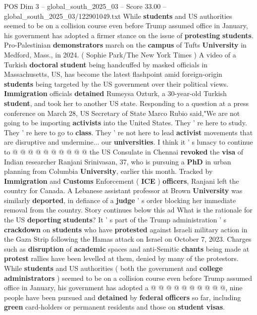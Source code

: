 \begin{textsample}{POS Dim 3 – global\_south\_2025\_03 – Score 33.00 – global\_south\_2025\_03/122901049.txt}  \label{ex:f3_pos_032}
While \textbf{students} and US authorities seemed to be on a collision course even before Trump assumed office in January, his government has adopted a firmer stance on the issue of \textbf{protesting} \textbf{students}.
Pro-Palestinian \textbf{demonstrators} march on the \textbf{campus} of Tufts \textbf{University} in Medford, Mass., in 2024. ( Sophie Park/The New York Times ) A video of a Turkish \textbf{doctoral} \textbf{student} being handcuffed by masked officials in Massachusetts, US, has become the latest flashpoint amid foreign-origin \textbf{students} being targeted by the US government over their political views. \textbf{Immigration} officials \textbf{detained} Rumeysa Ozturk, a 30-year-old Turkish \textbf{student}, and took her to another US state.
Responding to a question at a press conference on March 28, US Secretary of State Marco Rubio said,"We are not going to be importing \textbf{activists} into the United States.
They ' re here to study.
They ' re here to go to \textbf{class}.
They ' re not here to lead \textbf{activist} movements that are disruptive and undermine... our \textbf{universities}.
I think it ' s lunacy to continue to @ @ @ @ @ @ @ @ @ @ the US Consulate in Chennai \textbf{revoked} the \textbf{visa} of Indian researcher Ranjani Srinivasan, 37, who is pursuing a \textbf{PhD} in urban planning from Columbia \textbf{University}, earlier this month.
Tracked by \textbf{Immigration} and \textbf{Customs} Enforcement ( \textbf{ICE} ) \textbf{officers}, Ranjani left the country for Canada.
A Lebanese assistant professor at Brown \textbf{University} was similarly \textbf{deported}, in defiance of a \textbf{judge} ' s order blocking her immediate removal from the country.
Story continues below this ad What is the rationale for the US \textbf{deporting} \textbf{students}?
It ' s part of the Trump administration ' s \textbf{crackdown} on \textbf{students} who have \textbf{protested} against Israeli military action in the Gaza Strip following the Hamas attack on Israel on October 7, 2023.
Charges such as \textbf{disruption} of \textbf{academic} spaces and anti-Semitic \textbf{chants} being made at \textbf{protest} rallies have been levelled at them, denied by many of the protestors.
While \textbf{students} and US authorities ( both the government and \textbf{college} \textbf{administrators} ) seemed to be on a collision course even before Trump assumed office in January, his government has adopted a @ @ @ @ @ @ @ @ @ @, nine people have been pursued and \textbf{detained} by \textbf{federal} \textbf{officers} so far, including \textbf{green} card-holders or permanent residents and those on \textbf{student} \textbf{visas}.

\end{textsample}
